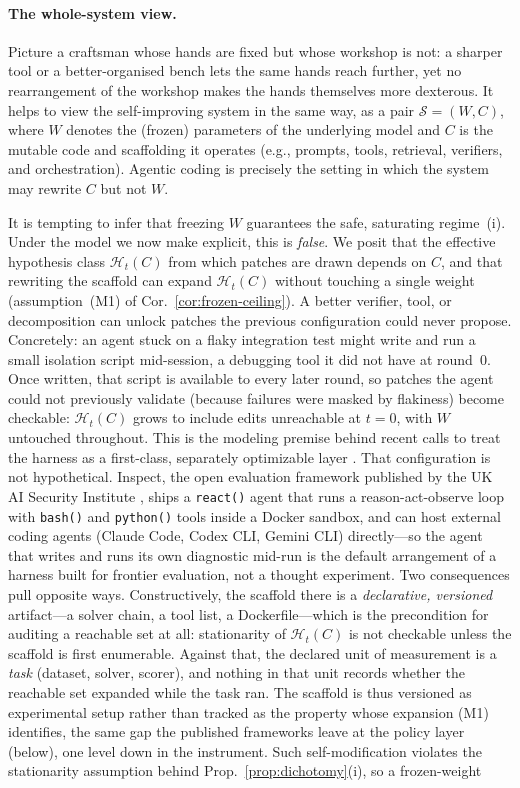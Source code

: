 \paragraph{The whole-system view.} Picture a craftsman whose hands are fixed but whose workshop is not: a sharper tool or a better-organised bench lets the same hands reach further, yet no rearrangement of the workshop makes the hands themselves more dexterous. It helps to view the self-improving system in the same way, as a pair $\mathcal{S} = (W, C)$, where $W$ denotes the (frozen) parameters of the underlying model and $C$ is the mutable code and scaffolding it operates (e.g., prompts, tools, retrieval, verifiers, and orchestration). Agentic coding is precisely the setting in which the system may rewrite $C$ but not $W$.

It is tempting to infer that freezing $W$ guarantees the safe, saturating regime~(i). Under the model we now make explicit, this is \emph{false}. We posit that the effective hypothesis class $\mathcal{H}_t(C)$ from which patches are drawn depends on $C$, and that rewriting the scaffold can expand $\mathcal{H}_t(C)$ without touching a single weight (assumption~(M1) of Cor.~\ref{cor:frozen-ceiling}). A better verifier, tool, or decomposition can unlock patches the previous configuration could never propose. Concretely: an agent stuck on a flaky integration test might write and run a small isolation script mid-session, a debugging tool it did not have at round~0. Once written, that script is available to every later round, so patches the agent could not previously validate (because failures were masked by flakiness) become checkable: $\mathcal{H}_t(C)$ grows to include edits unreachable at $t{=}0$, with $W$ untouched throughout. This is the modeling premise behind recent calls to treat the harness as a first-class, separately optimizable layer \citep{he2026harness}. That configuration is not hypothetical. Inspect, the open evaluation framework published by the UK AI Security Institute \citep{aisi2024inspect}, ships a \texttt{react()} agent that runs a reason-act-observe loop with \texttt{bash()} and \texttt{python()} tools inside a Docker sandbox, and can host external coding agents (Claude Code, Codex CLI, Gemini CLI) directly---so the agent that writes and runs its own diagnostic mid-run is the default arrangement of a harness built for frontier evaluation, not a thought experiment. Two consequences pull opposite ways. Constructively, the scaffold there is a \emph{declarative, versioned} artifact---a solver chain, a tool list, a Dockerfile---which is the precondition for auditing a reachable set at all: stationarity of $\mathcal{H}_t(C)$ is not checkable unless the scaffold is first enumerable. Against that, the declared unit of measurement is a \emph{task} (dataset, solver, scorer), and nothing in that unit records whether the reachable set expanded while the task ran. The scaffold is thus versioned as experimental setup rather than tracked as the property whose expansion (M1) identifies, the same gap the published frameworks leave at the policy layer (below), one level down in the instrument. Such self-modification violates the stationarity assumption behind Prop.~\ref{prop:dichotomy}(i), so a frozen-weight 